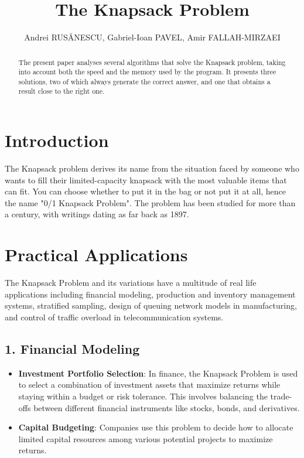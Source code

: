 \documentclass[runningheads]{llncs}
\begin{document}
%
\title{The Knapsack Problem}
%
%
\author{Andrei RUSĂNESCU,
 Gabriel-Ioan PAVEL,
Amir FALLAH-MIRZAEI}
%
%
\maketitle              %
%
\begin{abstract}
The present paper analyses several algorithms that solve the Knapsack problem,
taking into account both the speed and the memory used by the program. It
presents three solutions, two of which always generate the correct answer, and
one that obtains a result close to the right one.

\end{abstract}
%
%
%
\section{Introduction}
The Knapsack problem derives its name from the situation faced by someone who wants
to fill their limited-capacity knapsack with the most valuable items that can fit.
You can choose whether to put it in the bag or not put it at all, hence the name
"0/1 Knapsack Problem". The problem has been studied for more than a century, with
writings dating as far back as 1897. 

\section{Practical Applications}
The Knapsack Problem and its variations have a multitude of real life applications including financial modeling, production and inventory management systems, stratified sampling, design of queuing network models in manufacturing, and control of traffic overload in telecommunication systems.

\subsection*{1. Financial Modeling}
\begin{itemize}
    \item \textbf{Investment Portfolio Selection}: In finance, the Knapsack Problem is used to select a combination of investment assets that maximize returns while staying within a budget or risk tolerance. This involves balancing the trade-offs between different financial instruments like stocks, bonds, and derivatives.
    \item \textbf{Capital Budgeting}: Companies use this problem to decide how to allocate limited capital resources among various potential projects to maximize returns.
\end{itemize}
\end{document}
